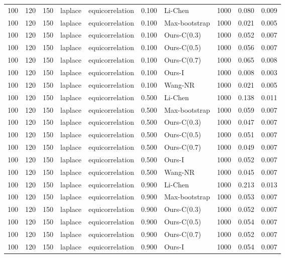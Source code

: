 \begin{tabular}{rrrllrlrrr}
100 & 120 & 150 & laplace & equicorrelation & 0.100 & Li-Chen & 1000 & 0.080 & 0.009 \\
100 & 120 & 150 & laplace & equicorrelation & 0.100 & Max-bootstrap & 1000 & 0.021 & 0.005 \\
100 & 120 & 150 & laplace & equicorrelation & 0.100 & Ours-C(0.3) & 1000 & 0.052 & 0.007 \\
100 & 120 & 150 & laplace & equicorrelation & 0.100 & Ours-C(0.5) & 1000 & 0.056 & 0.007 \\
100 & 120 & 150 & laplace & equicorrelation & 0.100 & Ours-C(0.7) & 1000 & 0.065 & 0.008 \\
100 & 120 & 150 & laplace & equicorrelation & 0.100 & Ours-I & 1000 & 0.008 & 0.003 \\
100 & 120 & 150 & laplace & equicorrelation & 0.100 & Wang-NR & 1000 & 0.021 & 0.005 \\
100 & 120 & 150 & laplace & equicorrelation & 0.500 & Li-Chen & 1000 & 0.138 & 0.011 \\
100 & 120 & 150 & laplace & equicorrelation & 0.500 & Max-bootstrap & 1000 & 0.059 & 0.007 \\
100 & 120 & 150 & laplace & equicorrelation & 0.500 & Ours-C(0.3) & 1000 & 0.047 & 0.007 \\
100 & 120 & 150 & laplace & equicorrelation & 0.500 & Ours-C(0.5) & 1000 & 0.051 & 0.007 \\
100 & 120 & 150 & laplace & equicorrelation & 0.500 & Ours-C(0.7) & 1000 & 0.049 & 0.007 \\
100 & 120 & 150 & laplace & equicorrelation & 0.500 & Ours-I & 1000 & 0.052 & 0.007 \\
100 & 120 & 150 & laplace & equicorrelation & 0.500 & Wang-NR & 1000 & 0.045 & 0.007 \\
100 & 120 & 150 & laplace & equicorrelation & 0.900 & Li-Chen & 1000 & 0.213 & 0.013 \\
100 & 120 & 150 & laplace & equicorrelation & 0.900 & Max-bootstrap & 1000 & 0.053 & 0.007 \\
100 & 120 & 150 & laplace & equicorrelation & 0.900 & Ours-C(0.3) & 1000 & 0.052 & 0.007 \\
100 & 120 & 150 & laplace & equicorrelation & 0.900 & Ours-C(0.5) & 1000 & 0.054 & 0.007 \\
100 & 120 & 150 & laplace & equicorrelation & 0.900 & Ours-C(0.7) & 1000 & 0.052 & 0.007 \\
100 & 120 & 150 & laplace & equicorrelation & 0.900 & Ours-I & 1000 & 0.054 & 0.007 \\

\end{tabular}
